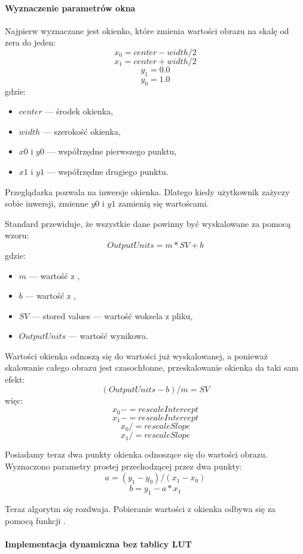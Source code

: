 \paragraph{Wyznaczenie parametrów okna}
\par
Najpierw wyznaczane jest  okienko, które zmienia wartości obrazu na skalę od zera do jeden:
\[x_0 = center - width / 2\]
\[x_1 = center + width / 2\]
\[y_1 = 0.0\]
\[y_0 = 1.0\]
gdzie:
\begin{itemize}
    \item $center$ --- środek okienka,
    \item $width$ --- szerokość okienka,
    \item $x0$ i $y0$ --- współrzędne pierwszego punktu,
    \item $x1$ i $y1$ --- współrzędne drugiego punktu.
\end{itemize}
Przeglądarka pozwala na inwersje okienka.
Dlatego kiedy użytkownik zażyczy sobie inwersji, zmienne $y0$ i $y1$ zamienią się wartoścami.

Standard \DICOM przewiduje, że wszystkie dane powinny być wyskalowane za pomocą wzoru:
\[OutputUnits = m*SV + b\]
gdzie:
\begin{itemize}
    \item $m$ --- wartość z ,
    \item $b$ --- wartość z ,
    \item $SV$ --- stored values --- wartość woksela z pliku,
    \item $OutputUnits$ --- wartość wynikowa.
\end{itemize}

Wartości okienka odnoszą się do wartości już wyskalowanej, a ponieważ skalowanie całego obrazu jest czasochłonne, przeskalowanie okienka da taki sam efekt:
\[(OutputUnits - b ) / m = SV \]
więc:
\[x_0 -= rescaleIntercept\]
\[x_1 -= rescaleIntercept\]
\[x_0 /= rescaleSlope\]
\[x_1 /= rescaleSlope\]

Posiadamy teraz dwa punkty okienka odnoszące się do wartości obrazu.
Wyznaczono parametry prostej przechodzącej przez dwa punkty:
\[a = (y_1 - y_0) / (x_1 - x_0)\]
\[b = y_1 - a * x_1\]

\par
Teraz algorytm się rozdwaja.
Pobieranie wartości z okienka odbywa się za pomocą funkcji .

\paragraph{Implementacja dynamiczna bez tablicy LUT}

